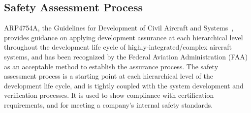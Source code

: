 \subsection{Safety Assessment Process}
\label{subsec:process}

ARP4754A, the Guidelines for Development of Civil Aircraft and Systems~\cite{SAE:ARP4754A}, provides guidance on applying development assurance at each hierarchical level throughout the development life cycle of highly-integrated/complex aircraft systems, and has been recognized by the Federal Aviation Administration (FAA) as an acceptable method to establish the assurance process. The safety assessment process is a starting point at each hierarchical level of the development life cycle, and is tightly coupled with the system development and verification processes. It is used to show compliance with certification requirements, and for meeting a company's internal safety standards. 


